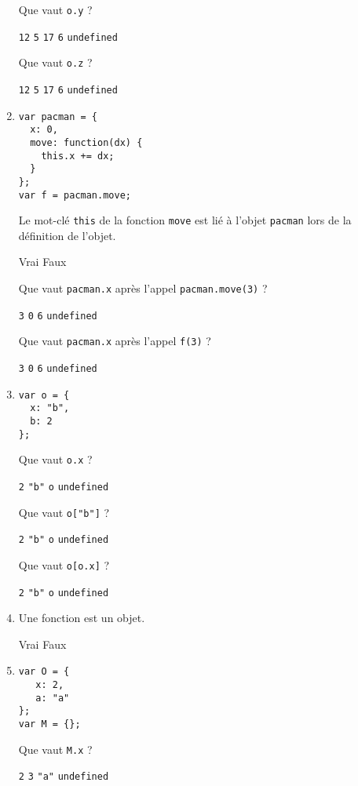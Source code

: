 \documentclass[a4paper, 12pt]{article}
\newcommand{\choice}[1]{\Square\hspace{2pt} #1\hspace{5pt}}
\newcommand{\choicec}[1]{\Square\hspace{2pt} \lstinline{#1}\hspace{5pt}}
\begin{document}
\begin{enumerate}
  Que vaut \lstinline{o.y} ?

  \choicec{12} \choicec{5} \choicec{17} \choicec{6} \choicec{undefined}

  Que vaut \lstinline{o.z} ?

  \choicec{12} \choicec{5} \choicec{17} \choicec{6} \choicec{undefined}
\item \lstset{language=javascript}
\begin{lstlisting}
var pacman = {
  x: 0,
  move: function(dx) {
    this.x += dx;
  }
};
var f = pacman.move;
\end{lstlisting}

  Le mot-clé \lstinline{this} de la fonction \lstinline{move} est lié
  à l'objet \lstinline{pacman} lors de la définition de l'objet.

  \choice{Vrai} \choice{Faux}

  Que vaut \lstinline{pacman.x} après l'appel
  \lstinline{pacman.move(3)} ?

  \choicec{3} \choicec{0} \choicec{6} \choicec{undefined}

  Que vaut \lstinline{pacman.x} après l'appel \lstinline{f(3)} ?

  \choicec{3} \choicec{0} \choicec{6} \choicec{undefined}
\item \lstset{language=javascript}
\begin{lstlisting}
var o = {
  x: "b",
  b: 2
};
\end{lstlisting}

  Que vaut \lstinline{o.x} ?

  \choicec{2} \choicec{"b"} \choicec{o} \choicec{undefined}

  Que vaut \lstinline{o["b"]} ?

  \choicec{2} \choicec{"b"} \choicec{o} \choicec{undefined}

  Que vaut \lstinline{o[o.x]} ?

  \choicec{2} \choicec{"b"} \choicec{o} \choicec{undefined}
\item Une fonction est un objet.

   \choice{Vrai} \choice{Faux}
\item \lstset{language=javascript}
\begin{lstlisting}
var O = {
   x: 2,
   a: "a"
};
var M = {};
\end{lstlisting}

  Que vaut \lstinline{M.x} ?

  \choicec{2} \choicec{3} \choicec{"a"} \choicec{undefined}


\end{enumerate}
\end{document}

